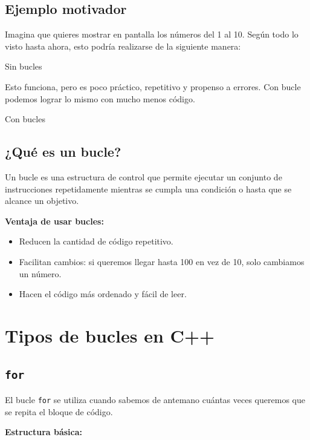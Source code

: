 \documentclass{article}
\newcommand{\cppfile}[2][]{
    \begin{container}{\faCode \space \space  #1}
        
    \end{container}
}
\begin{document}
\subsection{Ejemplo motivador}

Imagina que quieres mostrar en pantalla los números del 1 al 10. Según todo lo visto hasta ahora, esto podría realizarse de la siguiente manera:

\cppfile[Sin bucles]{codes/nobucle.cpp}

Esto funciona, pero es poco práctico, repetitivo y propenso a errores. Con bucle podemos lograr lo mismo con mucho menos código.

\cppfile[Con bucles]{codes/conbucle.cpp}


\subsection{¿Qué es un bucle?}

Un bucle es una estructura de control que permite ejecutar un conjunto de instrucciones repetidamente mientras se cumpla una condición o hasta que se alcance un objetivo.


\textbf{Ventaja de usar bucles:}

\begin{itemize}
    \item Reducen la cantidad de código repetitivo.
    
    \item Facilitan cambios: si queremos llegar hasta 100 en vez de 10, solo cambiamos un número.

    \item Hacen el código más ordenado y fácil de leer.
\end{itemize}

\vspace{0.5cm}

\section{Tipos de bucles en C++}

\subsection{\texttt{for}}

El bucle \texttt{for} se utiliza cuando sabemos de antemano cuántas veces queremos que se repita el bloque de código.

\textbf{Estructura básica:}
\end{document}
